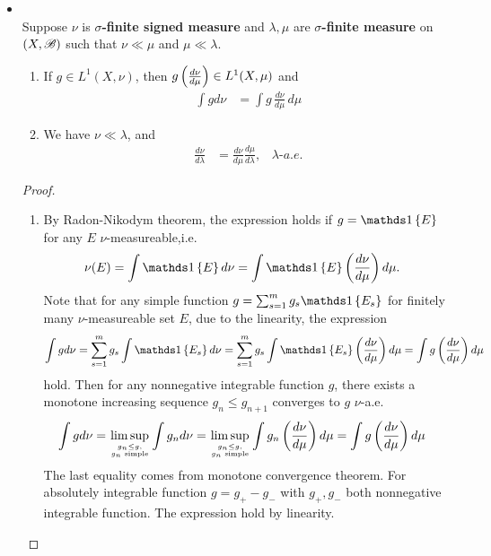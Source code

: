 \documentclass[11pt]{article}
\begin{document}
\begin{itemize}
\item \begin{proposition}\citep{folland2013real}\\
 Suppose $\nu$ is \textbf{$\sigma$-finite signed measure} and $\lambda, \mu$ are \textbf{$\sigma$-finite measure} on $(X,{\mathscr B})$ such that $\nu\ll \mu$ and $\mu \ll \lambda$.
 \begin{enumerate}
 \item If $g\in L^{1}(X, \nu)$, then $g\left(\frac{d \nu}{d\mu}\right)\in L^{1}(X,\mu)$ and
 \begin{align*}
 \int g d\nu &= \int g \, \frac{d \nu}{d\mu}\, d\mu
 \end{align*}
 \item We have $\nu \ll \lambda$, and 
 \begin{align*}
 \frac{d\nu}{d\lambda} &= \frac{d\nu}{d\mu}\frac{d\mu}{d\lambda}, \;\;\; \lambda\text{-}a.e.
 \end{align*}
 \end{enumerate}
\end{proposition}
\begin{proof}
\begin{enumerate}
\item By Radon-Nikodym theorem, the expression holds if $g= \ind{E}$ for any $E$ $\nu$-measureable,i.e.
\begin{align*}
\nu(E) = \int \ind{E}d\nu &=  \int \ind{E}\paren{\frac{d \nu}{d\mu}} d\mu.
\end{align*}
Note that for any simple function $g= \sum_{s=1}^{m}g_{s}\ind{E_{s}}$ for finitely many $\nu$-measureable set $E$, due to the linearity, the expression 
\begin{align*}
\int g d\nu = \sum_{s=1}^{m}g_{s}\int \ind{E_{s}}d\nu &= \sum_{s=1}^{m}g_{s}\int \ind{E_{s}}\paren{\frac{d \nu}{d\mu}} d\mu = \int g \paren{\frac{d \nu}{d\mu}} d\mu
\end{align*}
hold.  Then for any nonnegative integrable function $g$,  there exists a monotone increasing sequence $g_{n}\le g_{n+1}$ converges to $g$ $\nu$-a.e.
\begin{align*}
\int g d\nu = \limsup\limits_{g_{n}\le g, \atop g_{n}\text{ simple}} \int g_{n} d\nu&=  \limsup\limits_{g_{n}\le g, \atop g_{n}\text{ simple}} \int g_{n} \left(\frac{d \nu}{d\mu}\right) d\mu = \int g \left(\frac{d \nu}{d\mu}\right) d\mu
\end{align*}
The last equality comes from monotone convergence theorem. For absolutely integrable function $g= g_{+}- g_{-}$ with $g_{+}, g_{-}$ both nonnegative integrable function. The expression hold by linearity. 


\end{enumerate}
\end{proof}
\end{itemize}
\end{document}
